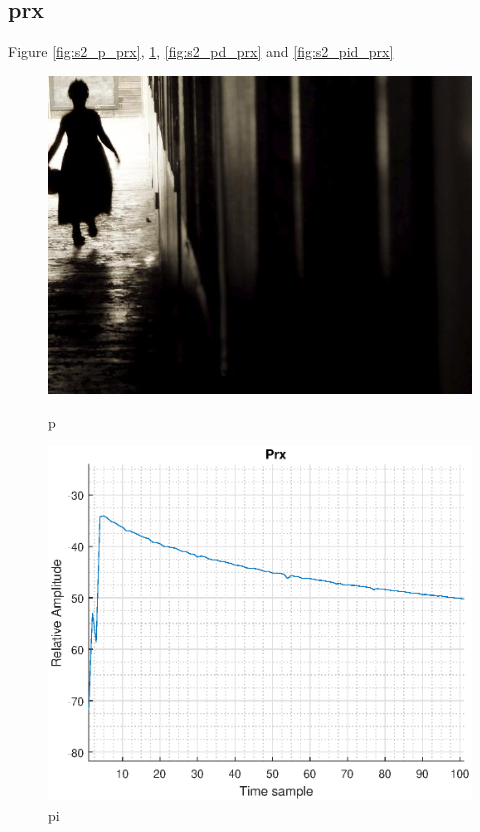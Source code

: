 \subsection{prx}
Figure \ref{fig:s2_p_prx}, \ref{fig:s2_pi_prx}, \ref{fig:s2_pd_prx} and \ref{fig:s2_pid_prx}
\begin{figure}[H]
\begin{minipage}[t]{0.45\textwidth}
\includegraphics[width=\linewidth]{figures/randomfigure.jpg}
\caption{p}
\label{fig:s2_p_prx}
\end{minipage}
\hspace{\fill}
\begin{minipage}[t]{0.45\textwidth}
\includegraphics[width=\linewidth]{figures/s2_pi_prx.eps}
\caption{pi}
\label{fig:s2_pi_prx}
\end{minipage}


\end{figure}
